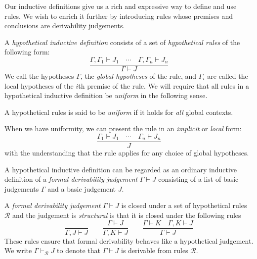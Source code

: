Our inductive definitions give us a rich and expressive way to define and use rules. We wish to enrich it further by introducing rules whose premises and conclusions are derivability judgements.

\begin{defin}
    A \emph{hypothetical inductive definition} consists of a set of \emph{hypothetical rules} of the following form:
    $$
        \frac{\Gamma, \Gamma_1 \vdash J_1 \quad \cdots \quad \Gamma, \Gamma_n \vdash J_n}{\Gamma \vdash J}
    $$
    We call the hypotheses $\Gamma$, the \emph{global hypotheses} of the rule, and $\Gamma_i$ are called the local hypotheses of the $i$th premise of the rule. We will require that all rules in a hypothetical inductive definition be \emph{uniform} in the following sense.
\end{defin}

\begin{defin}
    A hypothetical rules is said to be \emph{uniform} if it holds for \emph{all} global contexts.
\end{defin}

\begin{remark}
    When we have uniformity, we can present the rule in an \emph{implicit} or \emph{local} form:
    $$
        \frac{\Gamma_1 \vdash J_1 \quad \cdots \quad \Gamma_n \vdash J_n}{J}
    $$
    with the understanding that the rule applies for any choice of global hypotheses.
\end{remark}

\begin{remark}
    A hypothetical inductive definition can be regarded as an ordinary inductive definition of a \emph{formal derivability judgement} $\Gamma \vdash J$ consisting of a list of basic judgements $\Gamma$ and a basic judgement $J$.
\end{remark}

\begin{defin}\label{form_deri}
    A \emph{formal derivability judgement} $\Gamma \vdash J$ is closed under a set of hypothetical rules $\mathcal{R}$ and the judgement is \emph{structural} is that it is closed under the following rules
    $$
        \frac{}{\Gamma, J \vdash J} \qquad
        \frac{\Gamma \vdash J}{\Gamma , K \vdash J} \qquad
        \frac{\Gamma \vdash K \quad \Gamma , K \vdash J}{\Gamma \vdash J}
    $$
    These rules ensure that formal derivability behaves like a hypothetical judgement. We write $\Gamma \vdash_{\mathcal{R}} J$ to denote that $\Gamma \vdash J$ is derivable from rules $\mathcal{R}$.
\end{defin}

